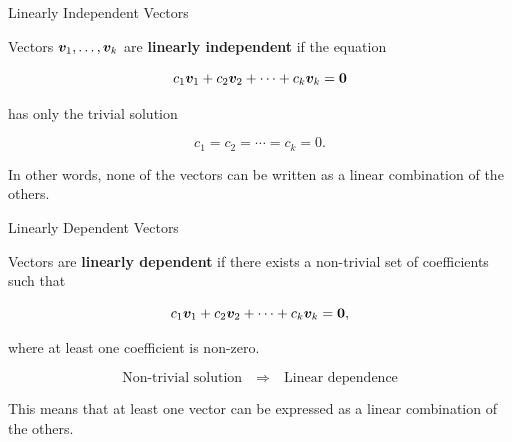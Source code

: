 
\begin{frame}{Linearly Independent Vectors}

Vectors $\bm{v}_1,\ldots,\bm{v}_k$ are \textbf{linearly independent}
if the equation

\[
c_1\bm{v}_1+
c_2\bm{v}_2+
\cdots+
c_k\bm{v}_k
=
\mathbf{0}
\]

has only the trivial solution

\[
\boxed{
c_1=c_2=\cdots=c_k=0.
}
\]

\vspace{0.5cm}

In other words, none of the vectors can be written as a
linear combination of the others.

\end{frame}



\begin{frame}{Linearly Dependent Vectors}

Vectors are \textbf{linearly dependent} if there exists a
non-trivial set of coefficients such that

\[
c_1\bm{v}_1+
c_2\bm{v}_2+
\cdots+
c_k\bm{v}_k
=
\mathbf{0},
\]

where at least one coefficient is non-zero.

\[
\boxed{
\text{Non-trivial solution}
\quad\Longrightarrow\quad
\text{Linear dependence}
}
\]

\vspace{0.4cm}

This means that at least one vector can be expressed as a
linear combination of the others.

\end{frame}




